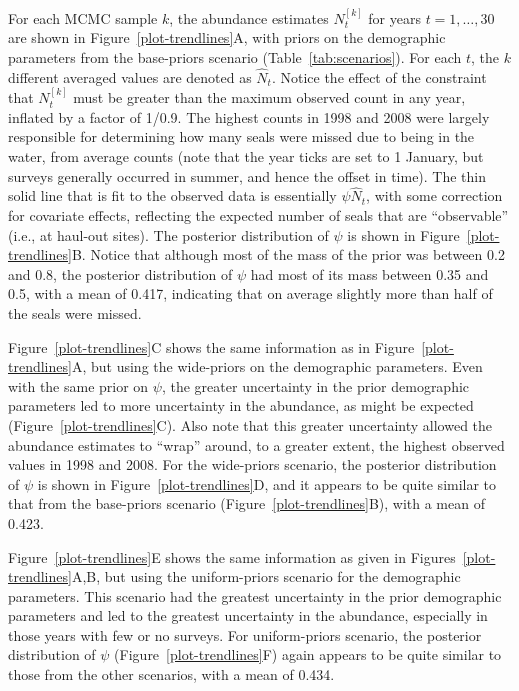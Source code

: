 \documentclass[12pt, titlepage]{article}\usepackage[]{graphicx}\usepackage[]{color}
\begin{document}
For each MCMC sample $k$, the abundance estimates $N_t^{[k]}$ for years $t = 1,\ldots,30$ are shown in Figure~\ref{plot-trendlines}A, with priors on the demographic parameters from the base-priors scenario (Table~\ref{tab:scenarios}). For each $t$, the $k$ different averaged values are denoted as $\hat{N}_t$.  Notice the effect of the constraint that $N_t^{[k]}$ must be greater than the maximum observed count in any year, inflated by a factor of 1/0.9. The highest counts in 1998 and 2008 were largely responsible for determining how many seals were missed due to being in the water, from average counts (note that the year ticks are set to 1 January, but surveys generally occurred in summer, and hence the offset in time).  The thin solid line that is fit to the observed data is essentially $\psi \hat{N}_t$, with some correction for covariate effects, reflecting the expected number of seals that are ``observable'' (i.e., at haul-out sites).  The posterior distribution of $\psi$ is shown in Figure~\ref{plot-trendlines}B. Notice that although most of the mass of the prior was between 0.2 and 0.8, the posterior distribution of $\psi$ had most of its mass between 0.35 and 0.5, with a mean of 0.417, indicating that on average slightly more than half of the seals were missed.

Figure~\ref{plot-trendlines}C shows the same information as in Figure~\ref{plot-trendlines}A, but using the wide-priors on the demographic parameters.  Even with the same prior on $\psi$, the greater uncertainty in the prior demographic parameters led to more uncertainty in the abundance, as might be expected (Figure~\ref{plot-trendlines}C). Also note that this greater uncertainty allowed the abundance estimates to ``wrap'' around, to a greater extent, the highest observed values in 1998 and 2008. For the wide-priors scenario, the posterior distribution of $\psi$ is shown in Figure~\ref{plot-trendlines}D, and it appears to be quite similar to that from the base-priors scenario (Figure~\ref{plot-trendlines}B), with a mean of 0.423.

Figure~\ref{plot-trendlines}E shows the same information as given in Figures~\ref{plot-trendlines}A,B, but using the uniform-priors scenario for the demographic parameters.  This scenario had the greatest uncertainty in the prior demographic parameters and led to the greatest uncertainty in the abundance, especially in those years with few or no surveys. For uniform-priors scenario, the posterior distribution of $\psi$ (Figure~\ref{plot-trendlines}F) again appears to be quite similar to those from the other scenarios, with a mean of 0.434.
\end{document}
